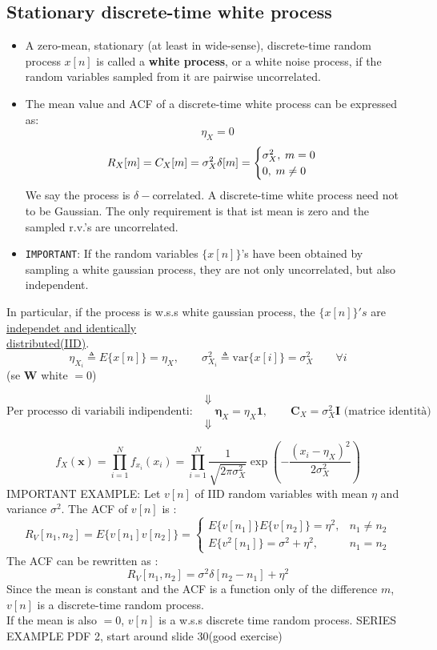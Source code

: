 \subsection{Stationary discrete-time white process}
\begin{itemize}
    \item A zero-mean, stationary (at least in wide-sense), discrete-time random process \(x[n]\) is called a \textbf{white process}, or a white noise process, if the random variables sampled from it are pairwise uncorrelated.
    \item The mean value and ACF of a discrete-time white process can be expressed as:
    \[
    \eta_X=0
    \]
    \[
    R_X[m]=C_X[m]=\sigma^2_X\delta[m]=\begin{cases}
        \sigma^2_X, \hspace{0.25em} m=0\\
        0, \hspace{0.25em}m\neq0
    \end{cases}
   \]
   We say the process is \(\delta-\)correlated.
   A discrete-time white process need not to be Gaussian. The only requirement is that ist mean is zero and the sampled r.v.'s are uncorrelated.
   \item \texttt{IMPORTANT}: If the random variables \(\{x[n]\}\)'s have been obtained by sampling a white gaussian process, they are not only uncorrelated, but also independent.
\end{itemize}
In particular, if the process is w.s.s white gaussian process, the \(\{x[n]\}'s\) are \underline{independet and identically}\\ \underline{distributed(IID)}.
\[
\eta_{X_i} \triangleq E\{x[n]\} = \eta_X,\qquad \sigma_{X_i}^2 \triangleq \mathrm{var}\{x[i]\} = \sigma_X^2 \qquad \forall i
\]
(se $\mathbf{W}$ white $=0$)

\[
\Downarrow
\]
\[
\text{Per processo di variabili indipendenti:}\qquad
\boldsymbol{\eta}_X = \eta_X \mathbf{1},\qquad \mathbf{C}_X = \sigma_X^2 \mathbf{I} \text{ (matrice identità)}
\]
\[
\Downarrow
\]

\[
f_X(\mathbf{x}) = \prod_{i=1}^N f_{x_i}(x_i) = \prod_{i=1}^N \frac{1}{\sqrt{2\pi\sigma_X^2}}
\exp\left( -\frac{(x_i - \eta_X)^2}{2\sigma_X^2} \right)
\]
IMPORTANT EXAMPLE: Let \(v[n]\) of IID random variables with mean \(\eta\) and variance \(\sigma^2\). The ACF of \(v[n]\) is :
\[
R_V[n_1, n_2] = E\{ v[n_1] v[n_2] \} = 
\begin{cases}
    E\{v[n_1]\} E\{v[n_2]\} = \eta^2, & n_1 \neq n_2 \\
    E\{v^2[n_1]\} = \sigma^2 + \eta^2, & n_1 = n_2
\end{cases}
\]
The ACF can be rewritten as :
\[
R_V[n_1,n_2]=\sigma^2\delta[n_2-n_1]+\eta^2
\]
Since the mean is constant and the ACF is a function only of the difference \(m\), \(v[n]\) is a discrete-time random process.\\
If the mean is also \(=0\), \(v[n]\) is a w.s.s discrete time random process.
SERIES EXAMPLE PDF 2, start around slide 30(good exercise)
